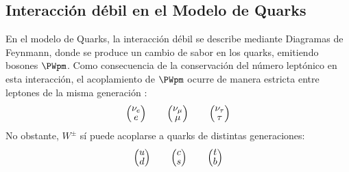 \subsection{Interacción débil en el Modelo de Quarks}\label{sec:weak_int_quarks}
En el modelo de Quarks, la interacción débil se describe  mediante Diagramas de Feynmann, donde se produce un cambio de sabor en los quarks, emitiendo bosones $\PWpm$. Como consecuencia de la conservación del número leptónico en esta interacción, el acoplamiento de $\PWpm$ ocurre de manera estricta entre leptones de la misma generación \cite{Griffiths2008}: 
\begin{align}
\begingroup 
\renewcommand*{\arraystretch}{0.8}
\setlength\arraycolsep{10pt}
\begin{pmatrix} \nu _{e} \\ e \end{pmatrix} \qquad
\begin{pmatrix} \nu _{\mu } \\ \mu \end{pmatrix} \qquad
\begin{pmatrix} \nu_{\tau} \\ \tau \end{pmatrix}
\endgroup
\end{align}
No obstante, $W^{\pm}$ sí puede acoplarse a quarks de distintas generaciones:
\begin{align}
\begingroup 
\renewcommand*{\arraystretch}{0.8}
\setlength\arraycolsep{10pt}
\begin{pmatrix} u \\ d \end{pmatrix} \qquad
\begin{pmatrix} c \\ s \end{pmatrix} \qquad
\begin{pmatrix} t \\ b \end{pmatrix}
\endgroup
\end{align}

